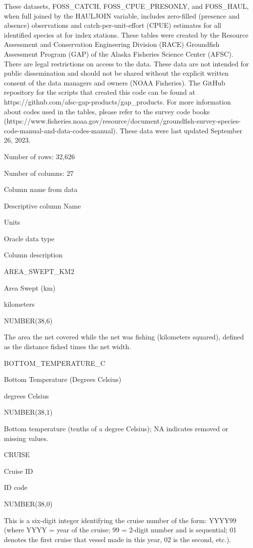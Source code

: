 \documentclass[
  letterpaper,
  oneside,
  open=any]{scrbook}
\begin{document}
These datasets, FOSS\_CATCH, FOSS\_CPUE\_PRESONLY, and FOSS\_HAUL, when
full joined by the HAULJOIN variable, includes zero-filled (presence and
absence) observations and catch-per-unit-effort (CPUE) estimates for all
identified species at for index stations. These tables were created by
the Resource Assessment and Conservation Engineering Division (RACE)
Groundfish Assessment Program (GAP) of the Alaska Fisheries Science
Center (AFSC). There are legal restrictions on access to the data. These
data are not intended for public dissemination and should not be shared
without the explicit written consent of the data managers and owners
(NOAA Fisheries). The GitHub repository for the scripts that created
this code can be found at
https://github.com/afsc-gap-products/gap\_products. For more information
about codes used in the tables, please refer to the survey code books
(https://www.fisheries.noaa.gov/resource/document/groundfish-survey-species-code-manual-and-data-codes-manual).
These data were last updated September 26, 2023.

Number of rows: 32,626

Number of columns: 27

Column name from data

Descriptive column Name

Units

Oracle data type

Column description

AREA\_SWEPT\_KM2

Area Swept (km)

kilometers

NUMBER(38,6)

The area the net covered while the net was fishing (kilometers squared),
defined as the distance fished times the net width.

BOTTOM\_TEMPERATURE\_C

Bottom Temperature (Degrees Celsius)

degrees Celsius

NUMBER(38,1)

Bottom temperature (tenths of a degree Celsius); NA indicates removed or
missing values.

CRUISE

Cruise ID

ID code

NUMBER(38,0)

This is a six-digit integer identifying the cruise number of the form:
YYYY99 (where YYYY = year of the cruise; 99 = 2-digit number and is
sequential; 01 denotes the first cruise that vessel made in this year,
02 is the second, etc.).
\end{document}
